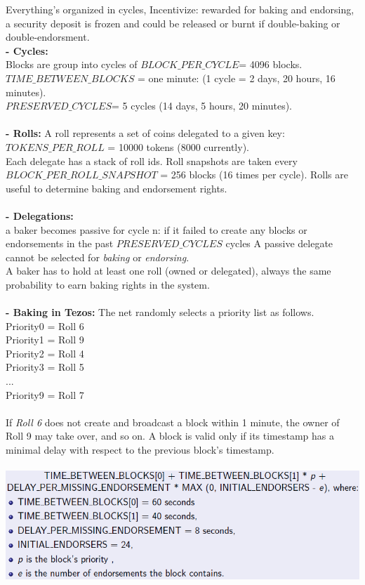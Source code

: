 \documentclass{article}
\begin{document}
Everything's organized in cycles, Incentivize: rewarded for baking and endorsing, 
a security deposit is frozen and could be released or burnt if double-baking or double-endorsment.\\
\textbf{- Cycles: } \\
Blocks are group into cycles of \textbf{$BLOCK\_PER\_CYCLE $}= 4096 blocks.\\ \textbf{$TIME\_BETWEEN\_BLOCKS$} = one minute: (1 cycle = 2 days, 20 hours, 16 minutes).\\ \textbf{$PRESERVED\_CYCLES $}= 5 cycles (14 days, 5 hours, 20 minutes).\\\\
\textbf{- Rolls: }A roll represents a set of coins delegated to a given key: \textbf{$TOKENS\_PER\_ROLL$} = 10000 tokens (8000 currently).\\
Each delegate has a stack of roll ids. Roll snapshots are taken every \textbf{$BLOCK\_PER\_ROLL\_SNAPSHOT$} = 256 blocks (16 times per cycle). Rolls are useful to determine baking and endorsement rights.\\\\
\textbf{- Delegations: }\\
a baker becomes passive for cycle n: if it failed to create any blocks or endorsements in the past \textit{$PRESERVED\_CYCLES$ }cycles
A passive delegate cannot be selected for \textit{baking }or \textit{endorsing}. \\
A baker has to hold at least one roll (owned or delegated), always the same probability to earn baking rights in the system.\\\\
\textbf{- Baking in Tezos: }The net randomly selects a priority list as follows.\\Priority0 = Roll 6\\
Priority1 = Roll 9\\
Priority2 = Roll 4\\
Priority3 = Roll 5\\
...\\
Priority9 = Roll 7\\\\
If \textit{Roll 6} does not create and broadcast a block within 1 minute, the owner of Roll 9 may take over, and so on. A block is valid only if its timestamp has a minimal delay with respect to the previous block's timestamp.\\\\
\includegraphics[scale=0.7]{46.png}\\
\end{document}
